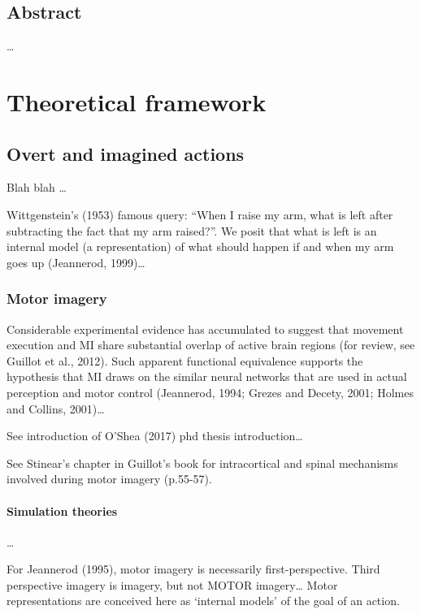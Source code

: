 \documentclass[12pt,]{book}
\begin{document}
\chapter*{Abstract}\label{abstract}

\ldots{}

\part{Theoretical
framework}\label{part-theoretical-framework}

\chapter{Overt and imagined actions}\label{intro}

Blah blah \citep{koster_rumination_2013}\ldots{}

Wittgenstein's (1953) famous query: ``When I raise my arm, what is left
after subtracting the fact that my arm raised?''. We posit that what is
left is an internal model (a representation) of what should happen if
and when my arm goes up (Jeannerod, 1999)\ldots{}

\section{Motor imagery}\label{motor-imagery}

Considerable experimental evidence has accumulated to suggest that
movement execution and MI share substantial overlap of active brain
regions (for review, see Guillot et al., 2012). Such apparent functional
equivalence supports the hypothesis that MI draws on the similar neural
networks that are used in actual perception and motor control
(Jeannerod, 1994; Grezes and Decety, 2001; Holmes and Collins,
2001)\ldots{}

See introduction of O'Shea (2017) phd thesis introduction\ldots{}

See Stinear's chapter in Guillot's book for intracortical and spinal
mechanisms involved during motor imagery (p.55-57).

\subsection{Simulation theories}\label{simulation-theories}

\ldots{}

For Jeannerod (1995), motor imagery is necessarily first-perspective.
Third perspective imagery is imagery, but not MOTOR imagery\ldots{}
Motor representations are conceived here as `internal models' of the
goal of an action.
\end{document}
